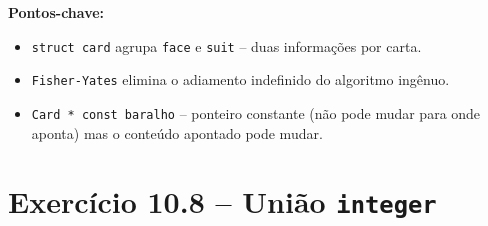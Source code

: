 \documentclass[12pt,a4paper]{article}
\begin{document}
\begin{respostabox}
\textbf{Pontos-chave:}
\begin{itemize}[noitemsep]
  \item \texttt{struct card} agrupa \texttt{face} e \texttt{suit} -- duas
  informações por carta.
  \item \texttt{Fisher-Yates} elimina o adiamento indefinido do algoritmo ingênuo.
  \item \texttt{Card * const baralho} -- ponteiro constante (não pode mudar para onde
  aponta) mas o conteúdo apontado pode mudar.
\end{itemize}
\end{respostabox}

\newpage

\section{Exercício 10.8 -- União \texttt{integer}}
\end{document}
